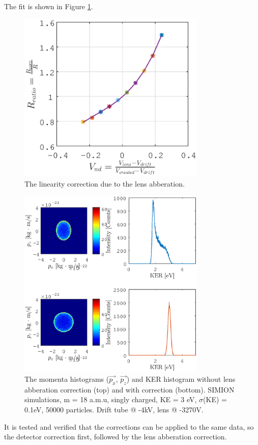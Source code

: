 The fit is shown in Figure \ref{dR_correction_fit}.

\begin{figure}[h]
   \centering
    \centerline{\includegraphics[width=0.8\textwidth]{Graphics/dR_correction_fit.eps}}
\caption{The linearity correction due to the lens abberation.}
\label{dR_correction_fit}
\end{figure}

\begin{figure}[h]
   \centering
    \centerline{\includegraphics[width=0.8\textwidth]{Graphics/SIMION_lens_corr_both.eps}}
\caption{The momenta histograms ($\vec{p_x}$, $\vec{p_z}$) and KER histogram without lens abberation correction (top) and with correction (bottom). SIMION simulations, m = 18 a.m.u, singly charged, KE = 3 eV, $\sigma$(KE) = 0.1eV, 50000 particles. Drift tube @ -4kV, lens @ -3270V.}
\label{SIMION_lens_corr_both}
\end{figure}

It is tested and verified that the corrections can be applied to the same data, so the detector correction first, followed by the lens abberation correction.

